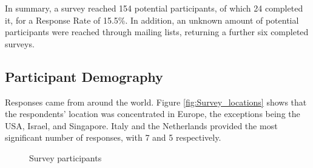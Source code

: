 In summary, a survey reached 154 potential participants, of which 24 completed it, for a Response Rate of 15.5\%.
In addition, an unknown amount of potential participants were reached through mailing lists, returning a further six completed surveys.

\subsection{Participant Demography}

Responses came from around the world.
Figure \ref{fig:Survey_locations} shows that the respondents' location was concentrated in Europe, the exceptions being the USA, Israel, and Singapore.
Italy and the Netherlands provided the most significant number of responses, with 7 and 5 respectively.

\begin{figure}
    \centering
    \caption{Survey participants}
    \label{fig:Survey_participants}
    \caption{Survey locations}
    \label{fig:Survey_locations}
    \begin{subfigure}{.33\textwidth}
      \centering

\end{subfigure}
\end{figure}
